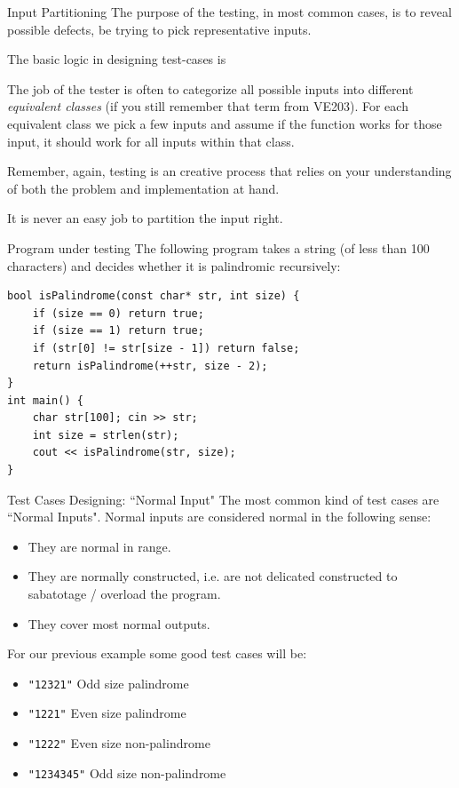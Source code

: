 \begin{frame}{Input Partitioning}
The purpose of the testing, in most common cases, is to reveal possible defects, be trying to pick representative inputs. 

The basic logic in designing test-cases is 
\begin{center}
\end{center}

The job of the tester is often to categorize all possible inputs into different \textit{equivalent classes} (if you still remember that term from VE203). For each equivalent class we pick a few inputs and assume if the function works for those input, it should work for all inputs within that class.

\vspace{0.1in}
Remember, again, \alert{testing is an creative process} that relies on your understanding of both the problem and implementation at hand. 

\vspace{0.1in}
It is never an easy job to partition the input right. 
\end{frame}

\begin{frame}[fragile]{Program under testing}
The following program takes a string (of less than 100 characters) and decides whether it is palindromic recursively:
\begin{verbatim}
bool isPalindrome(const char* str, int size) {
    if (size == 0) return true;
    if (size == 1) return true;
    if (str[0] != str[size - 1]) return false;
    return isPalindrome(++str, size - 2);
}
int main() { 
    char str[100]; cin >> str;
    int size = strlen(str);
    cout << isPalindrome(str, size);
}
\end{verbatim} 
\end{frame}

\begin{frame}{Test Cases Designing: ``Normal Input"}
The most common kind of test cases are ``Normal Inputs".  Normal inputs are considered normal in the following sense:
\begin{itemize}
	\item They are normal in range. 
	\item They are normally constructed, i.e. are not delicated constructed to sabatotage / overload the program.
	\item They cover most normal outputs. 
\end{itemize}
For our previous example some good test cases will be:
\begin{itemize}
	\item \texttt{"12321"} Odd size palindrome
	\item \texttt{"1221"} Even size palindrome
	\item \texttt{"1222"} Even size non-palindrome
	\item \texttt{"1234345"} Odd size non-palindrome
\end{itemize}
\end{frame}

